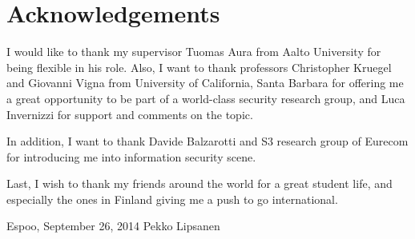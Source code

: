 \documentclass[12pt,a4paper,oneside,pdftex]{report}
\newcommand{\DATE}{September 26, 2014}
\newcommand{\AUTHOR}{Pekko Lipsanen}
\begin{document}


\chapter*{Acknowledgements}

I would like to thank my supervisor Tuomas Aura from Aalto University for being flexible in his role. Also, I want to thank professors Christopher Kruegel and Giovanni Vigna from University of California, Santa Barbara for offering me a great opportunity to be part of a world-class security research group, and Luca Invernizzi for support and comments on the topic.

In addition, I want to thank Davide Balzarotti and S3 research group of Eurecom for introducing me into information security scene.

Last, I wish to thank my friends around the world for a great student life, and especially the ones in Finland giving me a push to go international.

\vskip 10mm

\noindent Espoo, \DATE
\vskip 5mm
\noindent\AUTHOR

\cleardoublepage


\cleardoublepage
\tableofcontents

\end{document}
